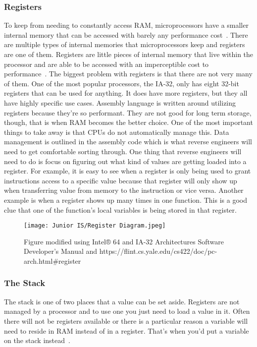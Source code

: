 \documentclass[12pt]{article}
\begin{document}
\subsubsection{Registers}
To keep from needing to constantly access RAM, microprocessors have a smaller internal memory that can be accessed with barely any performance cost~\cite{Reversing}. There are multiple types of internal memories that microprocessors keep and registers are one of them. Registers are little pieces of internal memory that live within the processor and are able to be accessed with an imperceptible cost to performance~\cite{PracticalRE}.
The biggest problem with registers is that there are not very many of them. One of the most popular processors, the IA-32, only has eight 32-bit registers that can be used for anything. It does have more registers, but they all have highly specific use cases. Assembly language is written around utilizing registers because they’re so performant. They are not good for long term storage, though, that is when RAM becomes the better choice. One of the most important things to take away is that CPUs do not automatically manage this. Data management is outlined in the assembly code which is what reverse engineers will need to get comfortable sorting through.
One thing that reverse engineers will need to do is focus on figuring out what kind of values are getting loaded into a register. For example, it is easy to see when a register is only being used to grant instructions access to a specific value because that register will only show up when transferring value from memory to the instruction or vice versa. Another example is when a register shows up many times in one function. This is a good clue that one of the function's local variables is being stored in that register.
\begin{figure}[h]
    \caption{Figure modified using Intel® 64 and IA-32 Architectures Software Developer’s Manual and https://flint.cs.yale.edu/cs422/doc/pc-arch.html\#register}
    \texttt{[image: Junior IS/Register Diagram.jpeg]}
\end{figure}

\subsubsection{The Stack}
The stack is one of two places that a value can be set aside. Registers are not managed by a processor and to use one you just need to load a value in it. Often there will not be registers available or there is a particular reason a variable will need to reside in RAM instead of in a register. That’s when you’d put a variable on the stack instead~\cite{Reversing}.
\end{document}
